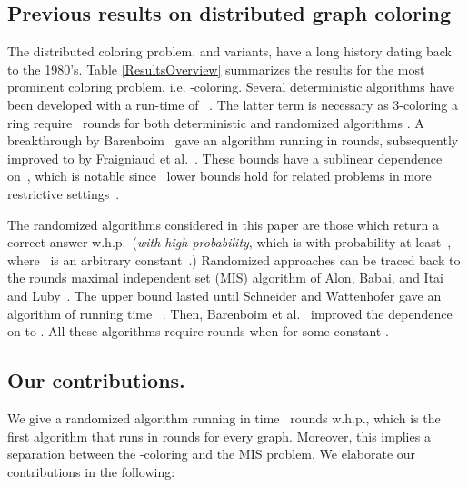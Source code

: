 \documentclass[11pt]{amsart}
\begin{document}
\subsection{Previous results on distributed graph coloring}
The distributed coloring problem, and variants, have a long history dating back to the 1980's. Table \ref{ResultsOverview} summarizes the results for the most prominent coloring problem, i.e. -coloring. Several deterministic algorithms have been developed with a run-time of  ~\cite{bar15a, BEK09,Kuhn2006On,linial92,GPS88,GP87}.  The latter term is necessary as 3-coloring a ring require~ rounds for both deterministic and randomized algorithms \cite{linial92, Noar91}.  A breakthrough by Barenboim~\cite{bar15a} gave an algorithm running in  rounds, subsequently improved to  by Fraigniaud et al.~\cite{FraigniaudHK15}. These bounds have a sublinear dependence on~, which is notable since~ lower bounds hold for related problems in more restrictive settings~\cite{ goo14, hef16, hir12, Kuhn2006On, SV93}.

The randomized algorithms considered in this paper are those which return a correct answer w.h.p.~({\it with high probability}, which is with probability at least~, where~ is an arbitrary constant~.) Randomized approaches can be traced back to the  rounds maximal independent set (MIS) algorithm of Alon, Babai, and Itai~\cite{alon86} and Luby~\cite{lub86}. The  upper bound lasted until Schneider and Wattenhofer gave an algorithm of running time~  \cite{Sch10}. Then, Barenboim et al.~\cite{BEPS16} improved the dependence on  to . All these algorithms require  rounds when  for some constant . 

\subsection{Our contributions.} We give a randomized algorithm running in time~ rounds w.h.p., which is the first algorithm that runs in  rounds for every graph. Moreover, this implies a separation between the -coloring and the MIS problem. We elaborate our contributions in the following:
\end{document}
